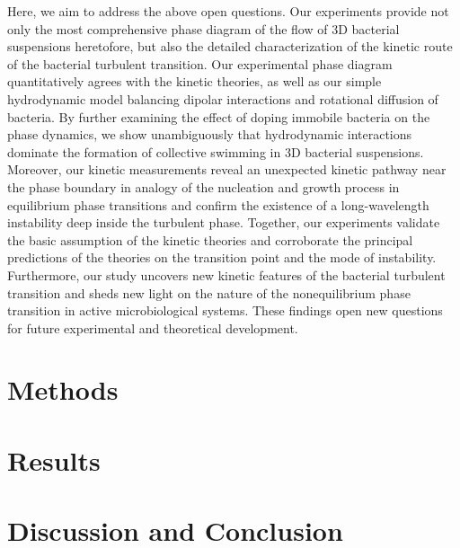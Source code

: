 Here, we aim to address the above open questions. Our experiments provide not only the most comprehensive phase diagram of the flow of 3D bacterial suspensions heretofore, but also the detailed characterization of the kinetic route of the bacterial turbulent transition. Our experimental phase diagram quantitatively agrees with the kinetic theories, as well as our simple hydrodynamic model balancing dipolar interactions and rotational diffusion of bacteria. By further examining the effect of doping immobile bacteria on the phase dynamics, we show unambiguously that hydrodynamic interactions dominate the formation of collective swimming in 3D bacterial suspensions. Moreover, our kinetic measurements reveal an unexpected kinetic pathway near the phase boundary in analogy of the nucleation and growth process in equilibrium phase transitions and confirm the existence of a long-wavelength instability deep inside the turbulent phase. Together, our experiments validate the basic assumption of the kinetic theories and corroborate the principal predictions of the theories on the transition point and the mode of instability. Furthermore, our study uncovers new kinetic features of the bacterial turbulent transition and sheds new
light on the nature of the nonequilibrium phase transition in active microbiological systems. These findings open new questions for future experimental and theoretical development.
\section{Methods}

\section{Results}

\section{Discussion and Conclusion}
